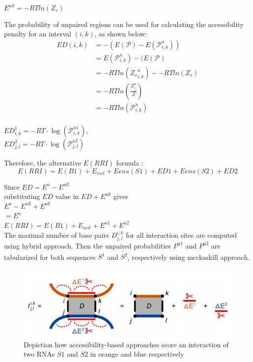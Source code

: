 \documentclass[twoside,a4paper]{report}
\begin{document}
	\begin{center}
		
		$E^{all} = - RTln({Z_s})$
		
	\end{center}
	The probability of unpaired regions can be used for calculating the accessibility penalty for an interval $(i,k)$, as shown below: \\
	
	\begin{align*}
	ED(i,k) &= - (E(\mathcal{P}) - E(\mathcal{P}_{i,k}^{u}))\\
	&= E(\mathcal{P}_{i,k}^{u}) - (E(\mathcal{P}) \\
	&= - RTln({Z_s}_{i,k}^{u}) - - RTln({Z_s})\\
	&= - RTln(\frac{Z^u_{i_j}}{Z})\\
	&= - RTln(\mathcal{P}_{i,k}^{u})\\
	\end{align*}
	
	\begin{center}
	$ED^{1}_{i,k} = - RT \cdot \log(\mathcal{P}^{u1}_{i,k})$,\\ 
	$ED^{2}_{j,l} =  - RT \cdot \log(\mathcal{P}^{u2}_{j,l})$\\
	\end{center}

	
	Therefore, the alternative $E(RRI)$ formula :\\
	\begin{equation}
	E(RRI) = E(B1) + E_{init} + Eens(S1) + ED1 + Eens(S2) + ED2
	\end{equation} 
	
 	Since $ED = E^u - E ^{all}$ \\
	substituting $ED$ value in  $ED + E^{all}$ gives\\
	 $E^u - E ^{all}+ E^{all}$ \\
	 $ = E^{u}$\\
	 $E(RRI) = E(B1) + E_{init} + E^{u1} + E^{u2} $\\
		 
	The maximal number of base pairs $D^{i,k}_{j,l}$ for all interaction sites are computed using hybrid approach. Then the  unpaired probabilities $P^{u1}$ and $P^{u2}$ are tabularized for both sequences $S^1$ and $\overleftarrow{S^2}$, respectively using mcckaskill approach.\\
	
	\begin{figure}[tb]
		\includegraphics[width=0.9\linewidth]{access}
		\centering
		\caption{ Depiction how accessibility-based approaches score an interaction of two RNAs $S1$ and $S2$ in orange and blue respectively} 
		\label{fig:access}
	\end{figure}
	
\end{document}
